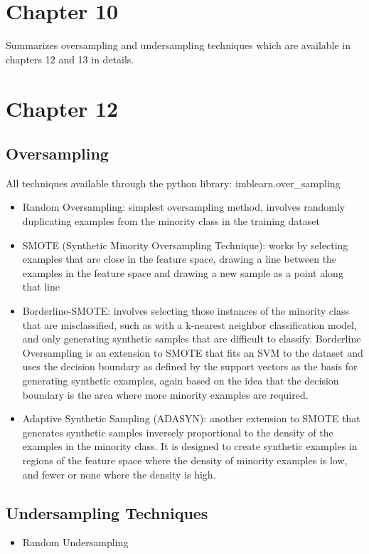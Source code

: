 \documentclass{article}
\begin{document}
\section{Chapter 10}
Summarizes oversampling and undersampling techniques which are available in chapters 12 and 13 in details.
\section{Chapter 12}
\subsection{Oversampling}
All techniques available through the python library: imblearn.over\_sampling

\begin{itemize}
    \item Random Oversampling: simplest oversampling method, involves randomly duplicating examples from the minority class in the training dataset
    \item SMOTE (Synthetic Minority Oversampling Technique): works by selecting examples that are close in the feature space, drawing a line between the examples in the feature space and drawing a new sample as a point along that line
    \item Borderline-SMOTE: involves selecting those instances of the minority class that are misclassified, such as with a k-nearest neighbor classification model, and only generating synthetic samples that are difficult to classify. Borderline Oversampling is an extension to SMOTE that fits an SVM to the dataset and uses the decision boundary as defined by the support vectors as the basis for generating synthetic examples, again based on the idea that the decision boundary is the area where more minority examples are required.
    \item Adaptive Synthetic Sampling (ADASYN): another extension to SMOTE that generates synthetic samples inversely proportional to the density of the examples in the minority class. It is designed to create synthetic examples in regions of the feature space where the density of minority examples is low, and fewer or none where the density is high.
\end{itemize}
\subsection{Undersampling Techniques}
\begin{itemize}
    \item Random Undersampling
\end{itemize}
\end{document}
